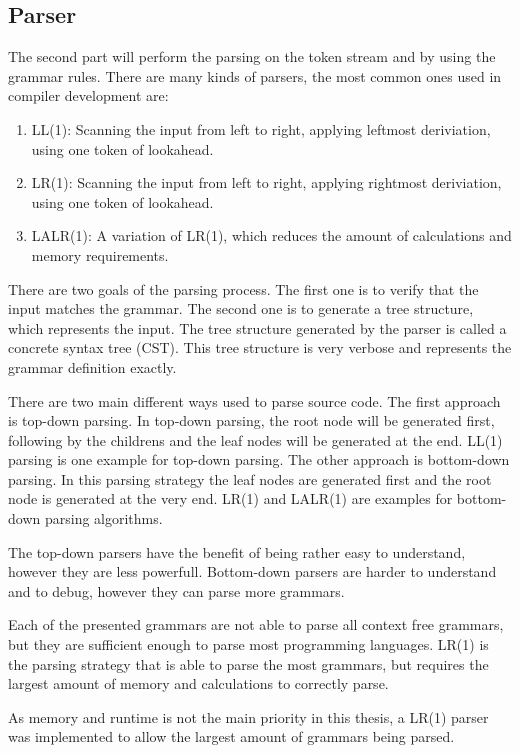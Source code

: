 
\subsection{Parser}

The second part will perform the parsing on the token stream and by using the grammar rules. There are many kinds of parsers, the most common ones used in compiler development are:

\begin{enumerate}
\item LL(1): Scanning the input from left to right, applying leftmost deriviation, using one token of lookahead.
\item LR(1): Scanning the input from left to right, applying rightmost deriviation, using one token of lookahead.
\item LALR(1): A variation of LR(1), which reduces the amount of calculations and memory requirements.
\end{enumerate}

There are two goals of the parsing process. The first one is to verify that the input matches the grammar. The second one is to generate a tree structure, which represents the input. The tree structure generated by the parser is called a concrete syntax tree (CST). This tree structure is very verbose and represents the grammar definition exactly.

There are two main different ways used to parse source code. The first approach is top-down parsing. In top-down parsing, the root node will be generated first, following by the childrens and the leaf nodes will be generated at the end. LL(1) parsing is one example for top-down parsing. The other approach is bottom-down parsing. In this parsing strategy the leaf nodes are generated first and the root node is generated at the very end. LR(1) and LALR(1) are examples for bottom-down parsing algorithms.

The top-down parsers have the benefit of being rather easy to understand, however they are less powerfull. Bottom-down parsers are harder to understand and to debug, however they can parse more grammars.

Each of the presented grammars are not able to parse all context free grammars, but they are sufficient enough to parse most programming languages. LR(1) is the parsing strategy that is able to parse the most grammars, but requires the largest amount of memory and calculations to correctly parse.

As memory and runtime is not the main priority in this thesis, a LR(1) parser was implemented to allow the largest amount of grammars being parsed.


